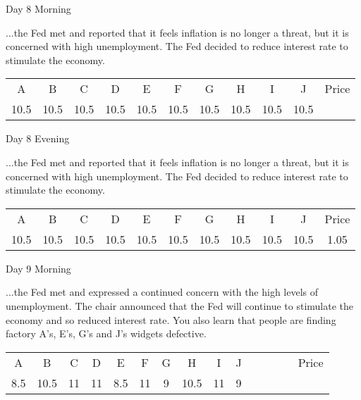 \documentclass[notes=show]{beamer}
\begin{document}
\begin{frame}{Day 8 Morning}

\qquad ...the Fed met and reported that it feels
inflation is no longer a threat, but it is concerned with high unemployment.
The Fed decided to reduce interest rate to stimulate the economy.

\bigskip

\begin{center}
\begin{tabular}{ccccccccccc}
A & B & C & D & E & F & G & H & I & J & Price \\ 
10.5 & 10.5 & 10.5 & 10.5 & 10.5 & 10.5 & 10.5 & 10.5 & 10.5 & 10.5 & 
\end{tabular}
\end{center}
\end{frame}

\begin{frame}{Day 8 Evening}

\qquad ...the Fed met and reported that it feels
inflation is no longer a threat, but it is concerned with high unemployment.
The Fed decided to reduce interest rate to stimulate the economy.

\bigskip

\begin{center}
\begin{tabular}{ccccccccccc}
A & B & C & D & E & F & G & H & I & J & Price \\ 
10.5 & 10.5 & 10.5 & 10.5 & 10.5 & 10.5 & 10.5 & 10.5 & 10.5 & 10.5 & 1.05%
\end{tabular}
\end{center}
\end{frame}%


\begin{frame}{Day 9 Morning}

\qquad ...the Fed met and expressed a continued concern
with the high levels of unemployment. The chair announced that the Fed will
continue to stimulate the economy and so reduced interest rate. You also
learn that people are finding factory A's, E's, G's and J's widgets
defective.

\bigskip

\begin{center}
\begin{tabular}{ccccccccccccccc}
A & B & C & D & E & F & G & H & I & J &  &  &  &  & Price \\ 
8.5 & 10.5 & 11 & 11 & 8.5 & 11 & 9 & 10.5 & 11 & 9 &  &  &  &  & 
\end{tabular}
\end{center}
\end{frame}
\end{document}
